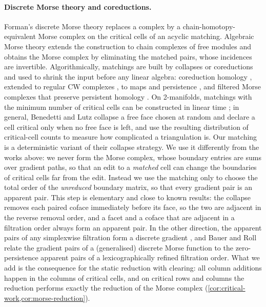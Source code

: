 \paragraph{Discrete Morse theory and coreductions.}
Forman's discrete Morse theory \cite{forman1998morse,forman2002user} replaces
a complex by a chain-homotopy-equivalent Morse complex on the critical cells
of an acyclic matching. Algebraic Morse theory
\cite{skoldberg2006morse,jollenbeck2009minimal} extends the construction to
chain complexes of free modules and obtains the Morse complex by eliminating the
matched pairs, whose incidences are invertible. Algorithmically, matchings are built by collapses or
coreductions and used to shrink the input before any linear algebra:
coreduction homology \cite{mrozek2009coreduction}, extended to regular CW
complexes \cite{dlotko2011coreduction}, to maps
and persistence \cite{mrozek2010coreduction,harker2014discrete}, and filtered
Morse complexes that preserve persistent homology \cite{mischaikow2013morse}.
On 2-manifolds, matchings with the minimum number of critical cells can be
constructed in linear time \cite{lewiner2003optimal}; in general, Benedetti
and Lutz \cite{benedetti2014random} collapse a free face chosen at random and
declare a cell critical only when no free face is left, and use the resulting
distribution of critical-cell counts to measure how complicated a
triangulation is. Our matching is a deterministic variant of their collapse
strategy. We use it differently from the works
above: we never form the Morse complex, whose boundary entries are sums over
gradient paths, so that an edit to a \emph{matched} cell can change the
boundaries of critical cells far from the edit. Instead we use the matching only to choose the total order of the
\emph{unreduced} boundary matrix, so that every gradient pair is an apparent
pair. This step is elementary and close to known results: the collapse removes
each paired coface immediately before its face, so the two are adjacent in the
reverse removal order, and a facet and a coface that are adjacent in a
filtration order always form an apparent pair. In the other direction, the
apparent pairs of any simplexwise filtration form a discrete gradient
\cite{bauer2021ripser}, and Bauer and Roll \cite{bauer2024wrapping} relate the
gradient pairs of a (generalised) discrete Morse function to the
zero-persistence apparent pairs of a lexicographically refined filtration
order. What we add is the consequence for the static reduction with clearing:
all column additions happen in the columns of critical cells, and on critical
rows and columns the reduction performs exactly the reduction of the Morse
complex (\cref{cor:critical-work,cor:morse-reduction}).

